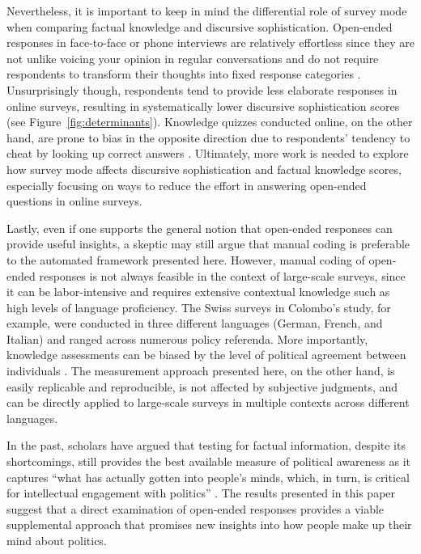 Nevertheless, it is important to keep in mind the differential role of survey mode when comparing factual knowledge and discursive sophistication. Open-ended responses in face-to-face or phone interviews are relatively effortless since they are not unlike voicing your opinion in regular conversations and do not require respondents to transform their thoughts into fixed response categories \citep[e.g.,][]{sudman1996thinking}. Unsurprisingly though, respondents tend to provide less elaborate responses in online surveys, resulting in systematically lower discursive sophistication scores (see Figure~\ref{fig:determinants}). Knowledge quizzes conducted online, on the other hand, are prone to bias in the opposite direction due to respondents' tendency to cheat by looking up correct answers \citep{clifford2016cheating}. Ultimately, more work is needed to explore how survey mode affects discursive sophistication and factual knowledge scores, especially focusing on ways to reduce the effort in answering open-ended questions in online surveys.

Lastly, even if one supports the general notion that open-ended responses can provide useful insights, a skeptic may still argue that manual coding is preferable to the automated framework presented here. However, manual coding of open-ended responses is not always feasible in the context of large-scale surveys, since it can be labor-intensive and requires extensive contextual knowledge such as high levels of language proficiency. The Swiss surveys in Colombo's \citeyearpar{colombo2016justifications} study, for example, were conducted in three different languages (German, French, and Italian) and ranged across numerous policy referenda. More importantly, knowledge assessments can be biased by the level of political agreement between individuals \citep[e.g.,][]{ryan2011accuracy}. The measurement approach presented here, on the other hand, is easily replicable and reproducible, is not affected by subjective judgments, and can be directly applied to large-scale surveys in multiple contexts across different languages.

In the past, scholars have argued that testing for factual information, despite its shortcomings, still provides the best available measure of political awareness as it captures ``what has actually gotten into people's minds, which, in turn, is critical for intellectual engagement with politics'' \citet[21]{zaller1992nature}. The results presented in this paper suggest that a direct examination of open-ended responses provides a viable supplemental approach that promises new insights into how people make up their mind about politics.


